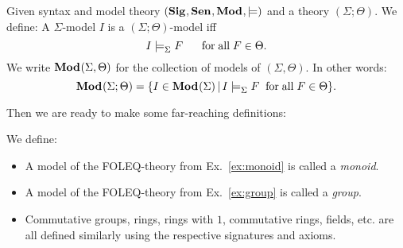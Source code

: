 \begin{definition}[Models]\label{def:mod:models}
Given syntax and model theory $({\mathbf{Sig}^{}},{\mathbf{Sen}^{}},{\mathbf{Mod}^{}},\models)$ and a theory $(\Sigma;\Theta)$. We define:
A $\Sigma$-model $I$ is a $(\Sigma;\Theta)$-model iff
 \[I\models^{}_{\Sigma}F \hspace*{.5cm}\;\mathrm{for}\;\mathrm{all}\; F\in\Theta.\]
 We write ${\mathbf{Mod}^{}}(\Sigma,\Theta)$ for the collection of models of $(\Sigma,\Theta)$. In other words:
 \[{\mathbf{Mod}^{}}(\Sigma;\Theta)=\{I\in{\mathbf{Mod}^{}}(\Sigma) \,|\, I\models^{}_{\Sigma}F \;\;\mathrm{for}\;\mathrm{all}\; F\in\Theta\}.\]
\end{definition}

Then we are ready to make some far-reaching definitions:
\begin{definition}
We define:
\begin{itemize}
\item A model of the FOLEQ-theory from Ex.~\ref{ex:monoid} is called a \emph{monoid}.
\item A model of the FOLEQ-theory from Ex.~\ref{ex:group} is called a \emph{group}.
\item Commutative groups, rings, rings with $1$, commutative rings, fields, etc. are all defined similarly using the respective signatures and axioms.
\end{itemize}
\end{definition}
\medskip

